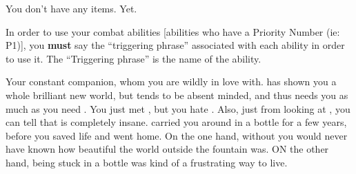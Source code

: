 \documentclass[char]{Katmeers}
\begin{document}
\begin{itemz}[Notes]
	\item You don't have any items. Yet.
	\item In order to use your combat abilities [abilities who have a Priority Number (ie: P1)], you {\bf must} say the ``triggering phrase'' associated with each ability in order to use it. The ``Triggering phrase'' is the name of the ability.
\end{itemz}

\begin{contacts}
	\contact{\cNeville{}} Your constant companion, whom you are wildly in love with. \cNeville{\they} has shown you a whole brilliant new world,  but \cNeville{\they} tends to be absent minded, and thus needs you as much as you need \cNeville{\them}.
	\contact{\cGinny{}} You just met \cGinny{\them}, but you hate \cGinny{\them}. Also, just from looking at \cGinny{\them}, you can tell that \cGinny{\they} is completely insane.
	\contact{\cMalfoy{}} \cMalfoy{\They} carried you around in a bottle for a few years, before you saved \cMalfoy{\their} life and went home. On the one hand, without \cMalfoy{\them} you would never have known how beautiful the world outside the fountain was. ON the other hand, being stuck in a bottle was kind of a frustrating way to live. 
\end{contacts}
\end{document}
